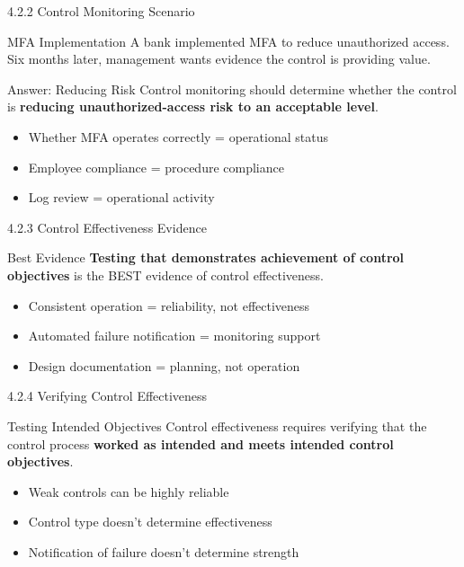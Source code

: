 \documentclass{beamer}
\begin{document}
	\begin{frame}{4.2.2 Control Monitoring Scenario}
		\begin{block}{MFA Implementation}
			A bank implemented MFA to reduce unauthorized access. Six months later, management wants evidence the control is providing value.
		\end{block}
		\begin{exampleblock}{Answer: Reducing Risk}
			Control monitoring should determine whether the control is \textbf{reducing unauthorized-access risk to an acceptable level}.
		\end{exampleblock}
		\begin{itemize}
			\item Whether MFA operates correctly = operational status
			\item Employee compliance = procedure compliance
			\item Log review = operational activity
		\end{itemize}
	\end{frame}
	
	\begin{frame}{4.2.3 Control Effectiveness Evidence}
		\begin{block}{Best Evidence}
			\textbf{Testing that demonstrates achievement of control objectives} is the BEST evidence of control effectiveness.
		\end{block}
		\begin{itemize}
			\item Consistent operation = reliability, not effectiveness
			\item Automated failure notification = monitoring support
			\item Design documentation = planning, not operation
		\end{itemize}
	\end{frame}
	
	\begin{frame}{4.2.4 Verifying Control Effectiveness}
		\begin{block}{Testing Intended Objectives}
			Control effectiveness requires verifying that the control process \textbf{worked as intended and meets intended control objectives}.
		\end{block}
		\begin{itemize}
			\item Weak controls can be highly reliable
			\item Control type doesn't determine effectiveness
			\item Notification of failure doesn't determine strength
		\end{itemize}
	\end{frame}
	
\end{document}
